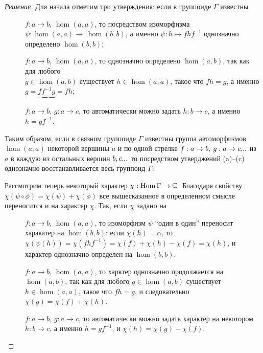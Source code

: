 \begin{proof}[Решение] Для начала отметим три утверждения: если в группоиде 
    $\Gamma$ известны
    \begin{description}
        \item[] $f: a \to b$, $\hom(a,a)$, то посредством 
        изоморфизма $\psi : \hom(a,a) \to~\hom(b,b)$, а именно $\psi: h \mapsto 
        fhf^{-1}$ однозначно определено $\hom(b,b)$;
        \item[] $f: a \to b$, $\hom(a,a)$, то однозначно 
        определено $\hom(a,b)$, так как для любого \\$g \in \hom(a,b)$ существует 
        $h \in \hom(a,a)$, такое что $fh = g$, а именно \\$g = 
        f\underbrace{f^{-1}g} = fh$;
        \item[] $f: a \to b$, $g: a \to c$, то автоматически 
        можно задать $h: b \to c$, а именно $h = gf^{-1}$.
    \end{description}

    Таким образом, если в связном группоиде $\Gamma$ известны группа автоморфизмов 
    $\hom(a,a)$ некоторой вершины $a$ и по одной стрелке $f: a \to b,\: 
    g: a \to c,\!..$ из $a$ в каждую из остальных вершин $b,c,\!..$ то 
    посредством утверджений (a)--(c) однозначно восстанавливается весь группоид 
    $\Gamma$.

    Рассмотрим теперь некоторый характер $\chi: \operatorname*{Hom} \Gamma \to \mathbb{C}$.
    Благодаря свойству $\chi(\psi \circ \phi) = \chi(\psi) + \chi(\phi)$ все 
    вышесказанное в определенном смысле переносится и на характер $\chi$. Так, 
    если $\chi$ задано на 
    \begin{description}
        \item[] $f: a \to b$, $\hom(a,a)$, то изоморфизм $\psi$ 
        ``один в один'' переносит харакатер на $\hom (b,b)$: если 
        $\chi(h) = \alpha$, то $\chi(\psi(h)) = \chi(fhf^{-1}) = \chi(f) + 
        \chi(h) - \chi(f) = \chi(h)$, и характер однозначно определен на 
        $\hom(b,b)$.
        \item[] $f: a \to b$, $\hom(a,a)$, то харктер однозначно 
        продолжается на $\hom(a,b)$, так как для любого $g \in \hom(a,b)$ существует 
        $h \in \hom(a,a)$, такое что $fh = g$, и следовательно $\chi(g) = 
        \chi(f) + \chi(h)$.
        \item[] $f: a \to b$, $g: a \to c$, то автоматически 
        можно задать характер на некотором $h: b \to c$, а именно $h = gf^{-1}$, 
        и $\chi(h) = \chi(g) - \chi(f)$.
    \end{description}


\end{proof}
